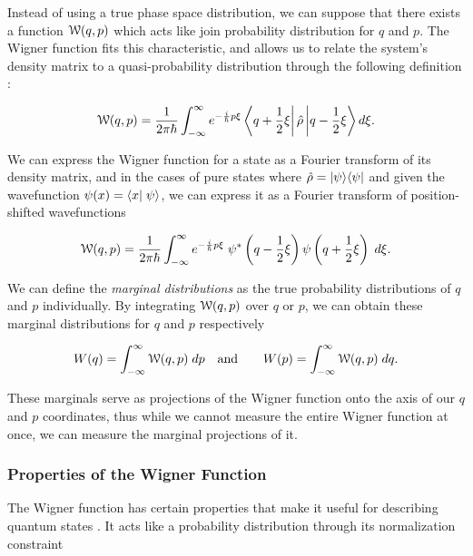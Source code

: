 Instead of using a true phase space distribution, we can suppose that there
exists a function $\mathcal{W}(q,p)$ which acts like join probability distribution for
$q$ and $p$.  The Wigner function fits this characteristic, and allows us to relate the system's density matrix to a quasi-probability distribution through the following definition \cite{schleich2001quantum}:

\begin{equation}
  \label{eq:wigner_function}
  \mathcal{W}(q,p) = \frac{1}{2\pi \hbar} \int^\infty_{-\infty} e^{-\frac{i}{\hbar}p \xi}
\left< q+\frac{1}{2}\xi \right| \hat{\rho} \left| q-\frac{1}{2}\xi \right> d\xi.
\end{equation}

\noindent
We can express the Wigner function for a state as a Fourier transform of its density matrix, and in the cases of pure states where $ \hat{\rho} =  \left| \psi \right> \! \left< \psi \right|$ and given the wavefunction $\psi(x) = \braket{x}{\psi}$, we can express it as a Fourier transform of position-shifted wavefunctions

\begin{equation}
  \label{eq:wigner_pure}
  \mathcal{W}(q,p) = \frac{1}{2\pi \hbar} \int^\infty_{-\infty} e^{-\frac{i}{\hbar}p \xi} \;
\psi^*\left(q-\frac{1}{2}\xi\right)\psi \left(q+\frac{1}{2} \xi \right) \;
d\xi.
\end{equation}

\noindent 
We can define the \emph{marginal distributions} as the true probability
distributions of $q$ and $p$ individually.  By integrating $\mathcal{W}(q,p)$ over $q$
or $p$, we can obtain these marginal distributions for $q$ and $p$ respectively \cite{leonhardt1997measuring} 

\begin{eqnarray}
  \label{eq:marginals}
  W(q) = \int^\infty_{-\infty} \mathcal{W}(q,p) \; dp    & \quad \text{and} \quad  &   W(p) = \int^\infty_{-\infty}
\mathcal{W}(q,p) \;   dq.
\end{eqnarray}

\noindent
These marginals serve as projections of the Wigner function onto the axis of
our $q$ and $p$ coordinates, thus while we cannot measure the entire Wigner function at once, we can measure the marginal projections of it.  

\subsubsection{Properties of the Wigner Function}
\label{properties_of_the_wigner_function} 

The Wigner function has certain properties that make it useful for describing quantum states \cite{schleich2001quantum} .  It acts like a probability distribution through its normalization constraint

